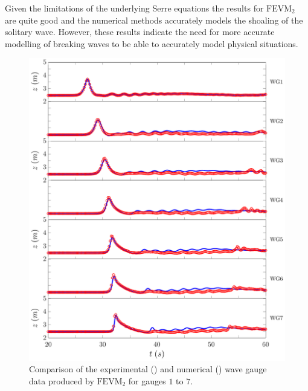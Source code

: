 Given the limitations of the underlying Serre equations the results for $\text{FEVM}_2$ are quite good and the numerical methods accurately models the shoaling of the solitary wave. However, these results indicate the need for more accurate modelling of breaking waves to be able to accurately model physical situations. 





\begin{figure}
	\centering
	\includegraphics[width=\textwidth]{./chp6/figures/Experiment/Roeber/Trial8/FEVM/LongWGs1.pdf}
	\caption{Comparison of the experimental () and numerical ({\color{blue}\solidrule}) wave gauge data produced by $\text{FEVM}_2$ for gauges $1$ to $7$.}
	\label{fig:Roeber8WG1to7FEVM}
\end{figure}
